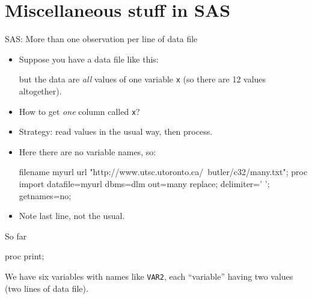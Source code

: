 \documentclass[unknownkeysallowed]{beamer}\usepackage[]{graphicx}\usepackage[]{color}
\begin{document}


\section{Miscellaneous stuff in SAS}

\frame{\sectionpage}





\begin{frame}[fragile]{SAS: More than one observation per line of data file}
  
  \begin{itemize}
  \item Suppose you have a data file like this:
    


but the data are \emph{all} values of one variable \texttt{x} (so
there are 12 values altogether).
\item How to get \emph{one} column called \texttt{x}?
\item Strategy: read values in the usual way, then process.
\item Here there are no variable names, so:

  \begin{footnotesize}
  \begin{Datastep}
filename myurl url 
  "http://www.utsc.utoronto.ca/~butler/c32/many.txt";
proc import
  datafile=myurl
    dbms=dlm out=many replace;
  delimiter=' ';
  getnames=no;
  \end{Datastep}
    
  \end{footnotesize}

\item Note last line, not the usual.

  \end{itemize}
  
\end{frame}

\begin{frame}[fragile]{So far}
  
  \begin{Sascode}[store=ma]
proc print;    
  \end{Sascode}
  

We have six variables with names like \texttt{VAR2}, each ``variable''
having two values (two lines of data file).

  
\end{frame}
\end{document}
